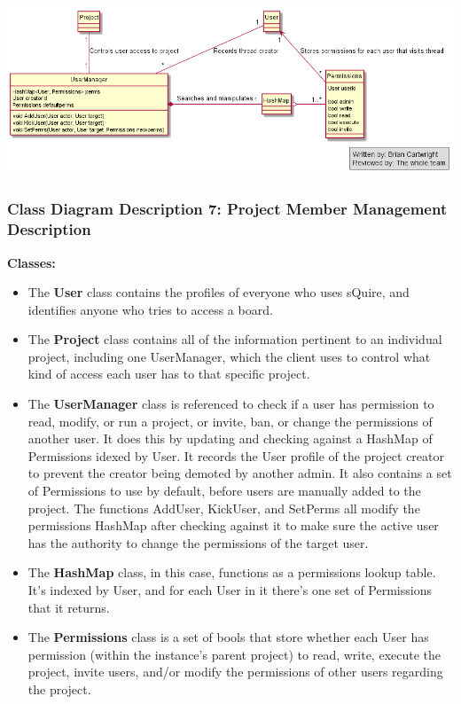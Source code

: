 \documentclass[twoside,letterpaper]{article}
\begin{document}
{\includegraphics[width=\textwidth]{images/ClassDiagrams/ProjectMemberManagement}

\newpage

\subsubsection[Class Diagram Description 7: Project Member Management Description]{\rmfamily\bfseries\color{black}
	Class Diagram Description 7: Project Member Management Description}
\hypertarget{RefHeading22059017292}{}

\textbf{Classes:}
\begin{itemize}

	\item The \textbf{User} class contains the profiles of everyone who uses sQuire, and identifies anyone who tries to access a board.  
	\item The \textbf{Project} class contains all of the information pertinent to an individual project, including one UserManager, which the client uses to control what kind of access each user has to that specific project.
	\item The \textbf{UserManager} class is referenced to check if a user has permission to read, modify, or run a project, or invite, ban, or change the permissions of another user. It does this by updating and checking against a HashMap of Permissions idexed by User. It records the User profile of the project creator to prevent the creator being demoted by another admin. It also contains a set of Permissions to use by default, before users are manually added to the project. 
	The functions AddUser, KickUser, and SetPerms all modify the permissions HashMap after checking against it to make sure the active user has the authority to change the permissions of the target user.
	\item The \textbf{HashMap} class, in this case, functions as a permissions lookup table. It's indexed by User, and for each User in it there's one set of Permissions that it returns.
	\item The \textbf{Permissions} class is a set of bools that store whether each User has permission (within the instance's parent project) to read, write, execute the project, invite users, and/or modify the permissions of other users regarding the project. 
\end{itemize}



}
\end{document}
